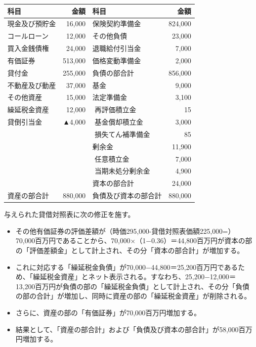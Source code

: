 \documentclass[report,gutter=10mm,fore-edge=10mm,uplatex,dvipdfmx]{jlreq}
\begin{document}
\begin{tabular}{|l|r||l|r|}
\hline
科目 &  金額 &   科目 & 金額 \\ \hline
現金及び預貯金 & 16,000 & 保険契約準備金 & 824,000 \\
コールローン & 12,000 &その他負債 & 23,000 \\
買入金銭債権 & 24,000 & 退職給付引当金 & 7,000 \\
有価証券 & 513,000 & 価格変動準備金 & 2,000 \\
\cline{3-4}
貸付金 & 255,000 &負債の部合計 & 856,000 \\
\cline{3-4}
不動産及び動産& 37,000 &基金 & 9,000 \\
その他資産& 15,000 &法定準備金 & 3,100 \\
繰延税金資産& 12,000 &\,\,再評価積立金 & 15 \\
貸倒引当金 & ▲4,000 &\,\,基金償却積立金 & 3,000 \\
 &  &\,\,損失てん補準備金 & 85 \\
 &  &剰余金& 11,900 \\
 &  &\,\,任意積立金 & 7,000 \\
 &  &\,\,当期未処分剰余金 & 4,900 \\
\cline{3-4}
 &  &資本の部合計& 24,000 \\
\hline
資産の部合計 &  880,000 &負債及び資本の部合計& 880,000 \\
\hline
\end{tabular}


与えられた貸借対照表に次の修正を施す。
\begin{itemize}
\item その他有価証券の評価差額が（時価295,000-貸借対照表価額225,000=）70,000百万円であることから、70,000×（1−0.36）＝44,800百万円が資本の部の「評価差額金」として計上され、その分「資本の部合計」が増加する。
\item これに対応する「繰延税金負債」が70,000−44,800＝25,200百万円であるため、「繰延税金資産」とネット表示される。すなわち、25,200−12,000＝13,200百万円が負債の部の「繰延税金負債」として計上され、その分「負債の部の合計」が増加し、同時に資産の部の「繰延税金資産」が削除される。
\item さらに、資産の部の「有価証券」が70,000百万円増加する。
\item 結果として、「資産の部合計」および「負債及び資本の部合計」が58,000百万円増加する。
\end{itemize}
\end{document}
